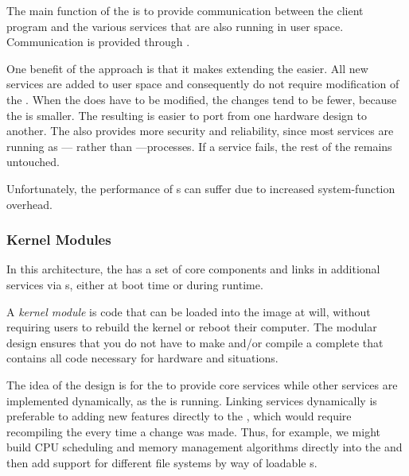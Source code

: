 The main function of the  is to provide communication between the client program and the various services that are also running in user space.
Communication is provided through .

One benefit of the  approach is that it makes extending the  easier.
All new services are added to user space and consequently do not require modification of the .
When the  does have to be modified, the changes tend to be fewer, because the  is smaller.
The resulting  is easier to port from one hardware design to another.
The  also provides more security and reliability, since most services are running as — rather than —processes.
If a service fails, the rest of the  remains untouched.

Unfortunately, the performance of s can suffer due to increased system-function overhead.

\subsubsection{Kernel Modules}\label{subsubsec:Kernel_Modules}
In this architecture, the  has a set of core components and links in additional services via s, either at boot time or during runtime.

\begin{definition}\label{def:Kernel_Module}
  A \emph{kernel module} is code that can be loaded into the  image at will, without requiring users to rebuild the kernel or reboot their computer.
  The modular design ensures that you do not have to make and/or compile a complete  that contains all code necessary for hardware and situations.
\end{definition}

The idea of the design is for the  to provide core services while other services are implemented dynamically, as the  is running.
Linking services dynamically is preferable to adding new features directly to the , which would require recompiling the  every time a change was made.
Thus, for example, we might build CPU scheduling and memory management algorithms directly into the  and then add support for different file systems by way of loadable s.

